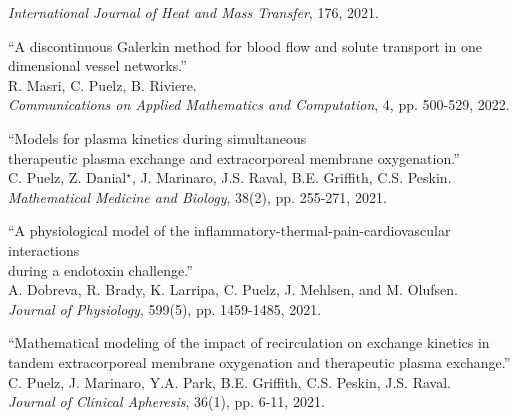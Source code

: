 \documentclass{article} %
\begin{document}
\begin{etaremune}
{\em International Journal of Heat and Mass Transfer}, 176, 2021.
\item ``A discontinuous Galerkin method for blood flow and solute transport in one dimensional vessel networks.'' \\
R. Masri, C. Puelz, B. Riviere. \\
{\em Communications on Applied Mathematics and Computation}, 4, pp. 500-529, 2022.
\item ``Models for plasma kinetics during simultaneous \\therapeutic plasma exchange and extracorporeal membrane oxygenation.'' \\
C. Puelz, Z. Danial$^\star$, J. Marinaro, J.S. Raval, B.E. Griffith, C.S. Peskin. \\ {\em Mathematical Medicine and Biology}, 38(2), pp. 255-271, 2021. 
\item ``A physiological model of the inflammatory-thermal-pain-cardiovascular interactions \\during a endotoxin challenge.''\\
 A. Dobreva, R. Brady, K. Larripa, C. Puelz, J. Mehlsen, and M. Olufsen. \\
{\em Journal of Physiology}, 599(5), pp. 1459-1485, 2021.
\item ``Mathematical modeling of the impact of recirculation on exchange kinetics in tandem extracorporeal membrane oxygenation and therapeutic plasma exchange.'' \\ 
C. Puelz, J. Marinaro, Y.A. Park, B.E. Griffith, C.S. Peskin, J.S. Raval.\\ 
{\em Journal of Clinical Apheresis}, 36(1), pp. 6-11, 2021.


\end{etaremune}
\end{document}
